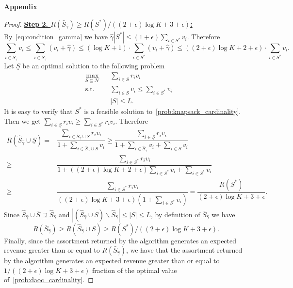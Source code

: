 \documentclass[msom,non-blindrev]{informs3} %
\theoremstyle{definition}
\begin{document}
\begin{appendices}{\Large \noindent\textbf{Appendix}}
{\begin{proof}
\noindent\underline{\bf Step 2. $R(\bar{S}_{\hat{\gamma}})\geq {R(S^*)}/{((2+\epsilon)\log K+3+\epsilon)}$:} By~\eqref{eq:condition_gamma} we have $\hat{\gamma}|S^*|\leq (1+\epsilon)\sum_{i\in S^*}v_i$. Therefore
\begin{equation*}
\sum_{i\in \hat{S}_{\hat{\gamma}}}v_i\leq \sum_{i\in \hat{S}_{\hat{\gamma}}}(v_i+\hat{\gamma})\leq (\log K+1)\cdot\sum_{i\in S^*}(v_i+\hat{\gamma})\leq ((2+\epsilon)\log K+2+\epsilon)\cdot \sum_{i\in S^*}v_i.
\end{equation*}
Let $\underline{S}$ be an optimal solution to the following problem
\begin{equation}\label{prob:knapsack_cardinality}
\begin{aligned}
&\max_{S\subseteq\mathcal{N}}&&\sum_{i\in S}r_iv_i\\
&\text{s.t.}&&\sum_{i\in S}v_i\leq \sum_{i\in S^*}v_{i}\\
&&&|S|\leq L.
\end{aligned}
\end{equation}
It is easy to verify that $S^*$ is a feasible solution to~\eqref{prob:knapsack_cardinality}. Then we get $\sum_{i\in \underline{S}}r_iv_i\geq \sum_{i\in S^*}r_iv_i$. Therefore
\begin{align*}
R(\hat{S}_{\hat{\gamma}}\cup \underline{S})=&\dfrac{\sum_{i\in \hat{S}_{\hat{\gamma}}\cup \underline{S}}r_iv_i}{1+\sum_{i\in \hat{S}_{\hat{\gamma}}\cup \underline{S}}v_i}\geq \dfrac{\sum_{i\in \underline{S}}r_iv_i}{1+\sum_{i\in \hat{S}_{\hat{\gamma}}}v_i+\sum_{i\in \underline{S}}v_i}\\
\geq &\dfrac{\sum_{i\in S^*}r_iv_i}{1+((2+\epsilon)\log K+2+\epsilon)\sum_{i\in S^*}v_i+\sum_{i\in S^*}v_i}\\
\geq &\dfrac{\sum_{i\in S^*}r_iv_i}{((2+\epsilon)\log K+3+\epsilon)(1+\sum_{i\in S^*}v_i)}=\dfrac{R(S^*)}{(2+\epsilon)\log K+3+\epsilon}.
\end{align*}
Since $\hat{S}_{\hat{\gamma}}\cup\bar{S}\supseteq \hat{S}_{\hat{\gamma}}$ and $|(\hat{S}_{\hat{\gamma}}\cup \underline{S})\backslash \hat{S}_{\hat{\gamma}}|\leq |\underline{S}|\leq L$, by definition of $\bar{S}_{\hat{\gamma}}$ we have $$R(\bar{S}_{\hat{\gamma}})\geq R(\hat{S}_{\hat{\gamma}}\cup \underline{S})\geq R(S^*)/((2+\epsilon)\log K+3+\epsilon).$$ Finally, since the assortment returned by the algorithm generates an expected revenue greater than or equal to $R(\bar{S}_{\hat{\gamma}})$, we have that the assortment returned by the algorithm generates an expected revenue greater than or equal to $1/((2+\epsilon)\log K+3+\epsilon)$ fraction of the optimal value of~\eqref{prob:daoc_cardinality}.
\end{proof}

}
\end{appendices}
\end{document}
